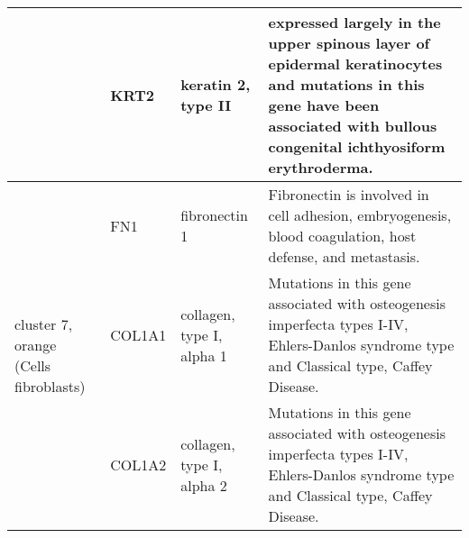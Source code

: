 \begin{table}[htp]
\begin{center}
\begin{tabular}{|p{0.7in}|p{0.5in}|p{1.4in}|p{3.6in}|}
					    & \small{KRT2} & \footnotesize{keratin 2, type II} & \scriptsize{expressed largely in the upper spinous layer of epidermal keratinocytes and mutations in this gene have been associated with bullous congenital ichthyosiform erythroderma.}\\
 \hline
 \multirow{3}{4em}{\small{cluster 7, orange (Cells fibroblasts)}} & \small{FN1}  & \footnotesize{fibronectin 1} & \scriptsize{Fibronectin is involved in cell adhesion, embryogenesis, blood coagulation, host defense, and metastasis.} \\
 					      & \small{COL1A1} & \footnotesize{collagen, type I, alpha 1} & \scriptsize{Mutations in this gene associated with osteogenesis imperfecta types I-IV, Ehlers-Danlos syndrome type and Classical type, Caffey Disease}. \\
					      & \small{COL1A2} & \footnotesize{collagen, type I, alpha 2} & \scriptsize{Mutations in this gene associated with osteogenesis imperfecta types I-IV, Ehlers-Danlos syndrome type and Classical type, Caffey Disease}. \\
\hline
\end{tabular}
\end{center}
\end{table}


